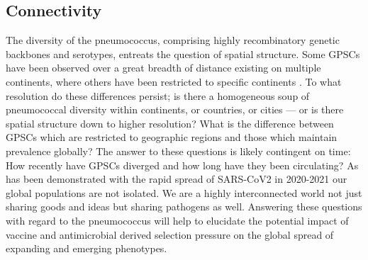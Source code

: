 \documentclass{article}
\begin{document}
\subsection{Connectivity} 
The diversity of the pneumococcus, comprising highly recombinatory genetic backbones and serotypes, entreats the question of spatial structure.  Some GPSCs have been observed over a great breadth of distance existing on multiple continents, where others have been restricted to specific continents \cite{gladstoneInternationalGenomicDefinition2019b}. To what resolution do these differences persist; is there a homogeneous soup of pneumococcal diversity within continents, or countries, or cities --- or is there spatial structure down to higher resolution? What is the difference between GPSCs which are restricted to geographic regions and those which maintain prevalence globally?  The answer to these questions is likely contingent on time: How recently have GPSCs diverged and how long have they been circulating? As has been demonstrated with the rapid spread of SARS-CoV2 in 2020-2021 our global populations are not isolated. We are a highly interconnected world not just sharing goods and ideas but sharing pathogens as well. Answering these questions with regard to the pneumococcus will help to elucidate the potential impact of vaccine and antimicrobial derived selection pressure on the global spread of expanding and emerging phenotypes. 
\end{document}
